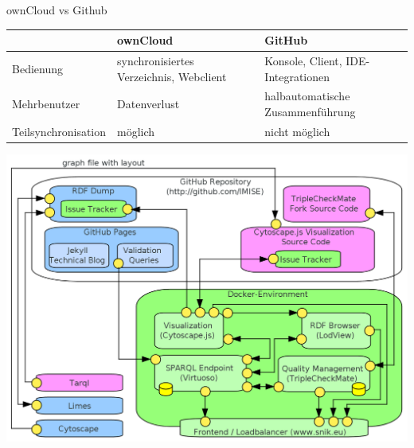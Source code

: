 \documentclass{beamer}
\begin{document}
\begin{frame}{ownCloud vs Github}
\begin{tabulary}{\textwidth}{lLL}
\toprule
			&ownCloud					&GitHub\\
\midrule
Bedienung		&synchronisiertes Verzeichnis, Webclient	&Konsole, Client, IDE-Integrationen\\
Mehrbenutzer		&Datenverlust					&halbautomatische Zusammenführung\\
Teilsynchronisation	&möglich					&nicht möglich\\
\bottomrule
\end{tabulary}
\end{frame}
\fi

\begin{frame}
\includegraphics[width=\textwidth]{img/architecture.png}
\end{frame}

 
 
 
\end{document}
